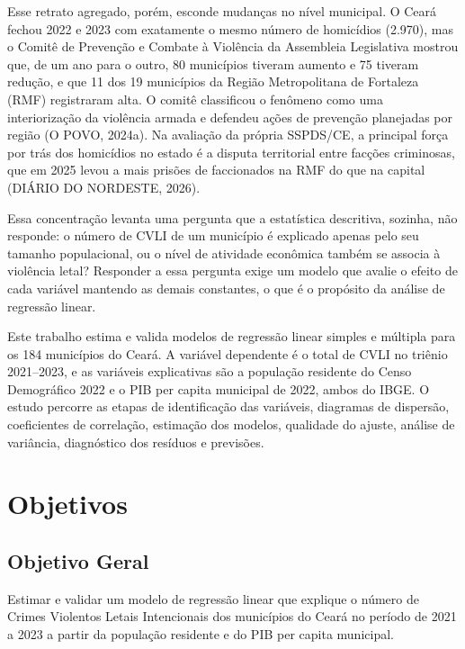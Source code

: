 \documentclass[12pt,a4paper]{article}
\begin{document}
	Esse retrato agregado, porém, esconde mudanças no nível municipal. O Ceará fechou 2022 e 2023 com exatamente o mesmo número de homicídios (2.970), mas o Comitê de Prevenção e Combate à Violência da Assembleia Legislativa mostrou que, de um ano para o outro, 80 municípios tiveram aumento e 75 tiveram redução, e que 11 dos 19 municípios da Região Metropolitana de Fortaleza (RMF) registraram alta. O comitê classificou o fenômeno como uma interiorização da violência armada e defendeu ações de prevenção planejadas por região (O POVO, 2024a). Na avaliação da própria SSPDS/CE, a principal força por trás dos homicídios no estado é a disputa territorial entre facções criminosas, que em 2025 levou a mais prisões de faccionados na RMF do que na capital (DIÁRIO DO NORDESTE, 2026).
	
	Essa concentração levanta uma pergunta que a estatística descritiva, sozinha, não responde: o número de CVLI de um município é explicado apenas pelo seu tamanho populacional, ou o nível de atividade econômica também se associa à violência letal? Responder a essa pergunta exige um modelo que avalie o efeito de cada variável mantendo as demais constantes, o que é o propósito da análise de regressão linear.
	
	Este trabalho estima e valida modelos de regressão linear simples e múltipla para os 184 municípios do Ceará. A variável dependente é o total de CVLI no triênio 2021--2023, e as variáveis explicativas são a população residente do Censo Demográfico 2022 e o PIB per capita municipal de 2022, ambos do IBGE. O estudo percorre as etapas de identificação das variáveis, diagramas de dispersão, coeficientes de correlação, estimação dos modelos, qualidade do ajuste, análise de variância, diagnóstico dos resíduos e previsões.
	
	\newpage
	
	\section{Objetivos}
	
	\subsection{Objetivo Geral}
	
	Estimar e validar um modelo de regressão linear que explique o número de Crimes Violentos Letais Intencionais dos municípios do Ceará no período de 2021 a 2023 a partir da população residente e do PIB per capita municipal.
	
\end{document}
